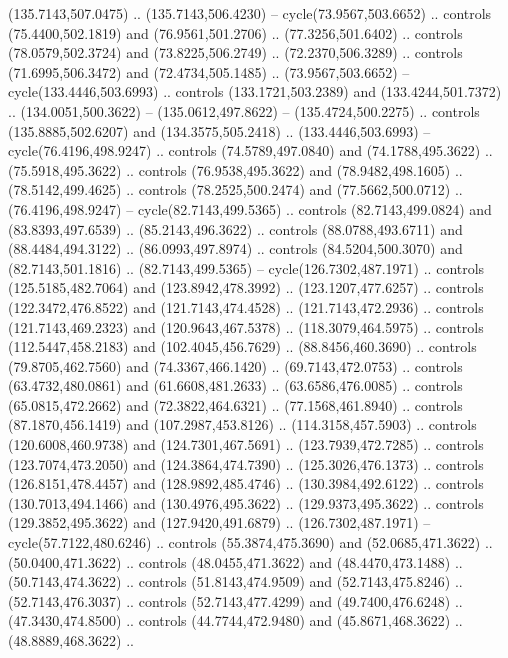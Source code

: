 \begin{scope}[shift={(58.28571,-442.36218)}]
    (135.7143,507.0475) .. (135.7143,506.4230) -- cycle(73.9567,503.6652) ..
    controls (75.4400,502.1819) and (76.9561,501.2706) .. (77.3256,501.6402) ..
    controls (78.0579,502.3724) and (73.8225,506.2749) .. (72.2370,506.3289) ..
    controls (71.6995,506.3472) and (72.4734,505.1485) .. (73.9567,503.6652) --
    cycle(133.4446,503.6993) .. controls (133.1721,503.2389) and
    (133.4244,501.7372) .. (134.0051,500.3622) -- (135.0612,497.8622) --
    (135.4724,500.2275) .. controls (135.8885,502.6207) and (134.3575,505.2418) ..
    (133.4446,503.6993) -- cycle(76.4196,498.9247) .. controls (74.5789,497.0840)
    and (74.1788,495.3622) .. (75.5918,495.3622) .. controls (76.9538,495.3622)
    and (78.9482,498.1605) .. (78.5142,499.4625) .. controls (78.2525,500.2474)
    and (77.5662,500.0712) .. (76.4196,498.9247) -- cycle(82.7143,499.5365) ..
    controls (82.7143,499.0824) and (83.8393,497.6539) .. (85.2143,496.3622) ..
    controls (88.0788,493.6711) and (88.4484,494.3122) .. (86.0993,497.8974) ..
    controls (84.5204,500.3070) and (82.7143,501.1816) .. (82.7143,499.5365) --
    cycle(126.7302,487.1971) .. controls (125.5185,482.7064) and
    (123.8942,478.3992) .. (123.1207,477.6257) .. controls (122.3472,476.8522) and
    (121.7143,474.4528) .. (121.7143,472.2936) .. controls (121.7143,469.2323) and
    (120.9643,467.5378) .. (118.3079,464.5975) .. controls (112.5447,458.2183) and
    (102.4045,456.7629) .. (88.8456,460.3690) .. controls (79.8705,462.7560) and
    (74.3367,466.1420) .. (69.7143,472.0753) .. controls (63.4732,480.0861) and
    (61.6608,481.2633) .. (63.6586,476.0085) .. controls (65.0815,472.2662) and
    (72.3822,464.6321) .. (77.1568,461.8940) .. controls (87.1870,456.1419) and
    (107.2987,453.8126) .. (114.3158,457.5903) .. controls (120.6008,460.9738) and
    (124.7301,467.5691) .. (123.7939,472.7285) .. controls (123.7074,473.2050) and
    (124.3864,474.7390) .. (125.3026,476.1373) .. controls (126.8151,478.4457) and
    (128.9892,485.4746) .. (130.3984,492.6122) .. controls (130.7013,494.1466) and
    (130.4976,495.3622) .. (129.9373,495.3622) .. controls (129.3852,495.3622) and
    (127.9420,491.6879) .. (126.7302,487.1971) -- cycle(57.7122,480.6246) ..
    controls (55.3874,475.3690) and (52.0685,471.3622) .. (50.0400,471.3622) ..
    controls (48.0455,471.3622) and (48.4470,473.1488) .. (50.7143,474.3622) ..
    controls (51.8143,474.9509) and (52.7143,475.8246) .. (52.7143,476.3037) ..
    controls (52.7143,477.4299) and (49.7400,476.6248) .. (47.3430,474.8500) ..
    controls (44.7744,472.9480) and (45.8671,468.3622) .. (48.8889,468.3622) ..

\end{scope}
